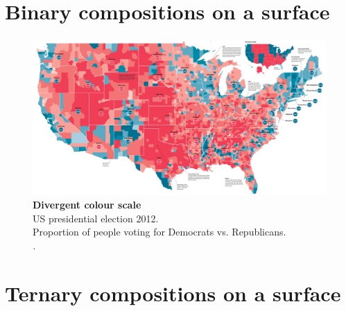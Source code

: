 \documentclass{beamer}
\begin{document}
\section{Binary compositions on a surface} %

\begin{frame}
\frametitle{\insertsection}

\begin{figure}[htb!]
\includegraphics[width = \textwidth]{../fig/plot-binary.png} \\
\small \textbf{Divergent colour scale}\\ US presidential election 2012.\\Proportion of people voting for Democrats vs. Republicans.\\\scriptsize\emph{\cite{GuardianGraphics2012}.}
\end{figure}

\end{frame}

\section{Ternary compositions on a surface} %
\end{document}
